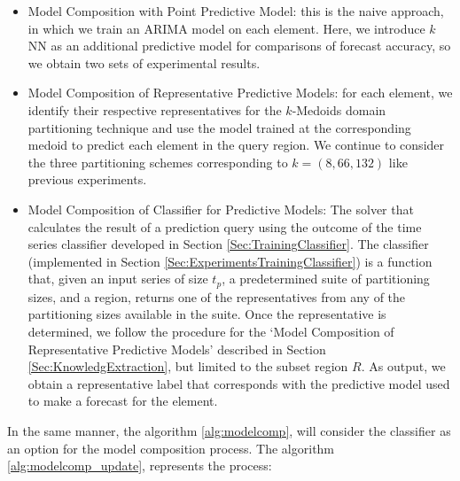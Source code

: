 \begin{itemize}
	\item Model Composition with Point Predictive Model: this is the naive approach, in which we train an ARIMA model on each element. Here, we introduce $k$NN as an additional predictive model for comparisons of forecast accuracy, so we obtain two sets of experimental results.
	\item Model Composition of Representative Predictive Models: for each element, we identify their respective representatives for the $k$-Medoids domain partitioning technique and use the model trained at the corresponding medoid to predict each element in the query region. We continue to consider the three partitioning schemes corresponding to $k=(8, 66, 132)$ like previous experiments.
	\item Model Composition of Classifier for Predictive Models: The solver that calculates the result of a prediction query using the outcome of the time series classifier developed in Section \ref{Sec:TrainingClassifier}. The classifier (implemented in Section \ref{Sec:ExperimentsTrainingClassifier}) is a function that, given an input series of size $t_{p}$, a predetermined suite of partitioning sizes, and a region, returns one of the representatives from any of the partitioning sizes available in the suite. Once the representative is determined, we follow the procedure for the `Model Composition of Representative Predictive Models' described in Section \ref{Sec:KnowledgExtraction}, but limited to the subset region $R$. As output, we obtain a representative label that corresponds with the predictive model used to make a forecast for the element.
\end{itemize}

In the same manner, the algorithm \ref{alg:modelcomp}, will consider the classifier as an option for the model composition process. The algorithm \ref{alg:modelcomp_update}, represents the process:

